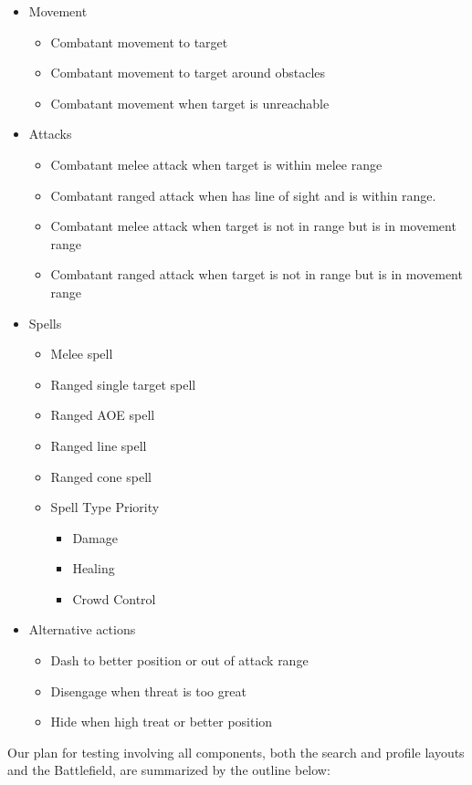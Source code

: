 \documentclass[12pt,a4paper]{report}
\begin{document}
	\begin{itemize}
		\item Movement
		\begin{itemize}
			\item Combatant movement to target
			\item Combatant movement to target around obstacles
			\item Combatant movement when target is unreachable
		\end{itemize}
		\item Attacks
		\begin{itemize}
			\item Combatant melee attack when target is within melee range
			\item Combatant ranged attack when has line of sight and is within range.
			\item Combatant melee attack when target is not in range but is in movement range
			\item Combatant ranged attack when target is not in range but is in movement range
		\end{itemize}
		\item Spells
		\begin{itemize}
			\item Melee spell
			\item Ranged single target spell
			\item Ranged AOE spell
			\item Ranged line spell
			\item Ranged cone spell
			\item Spell Type Priority
			\begin{itemize}
				\item Damage
				\item Healing
				\item Crowd Control
			\end{itemize}
		\end{itemize}
		\item Alternative actions
		\begin{itemize}
			\item Dash to better position or out of attack range
			\item Disengage when threat is too great
			\item Hide when high treat or better position
		\end{itemize}
	\end{itemize}
	
	Our plan for testing involving all components, both the search and profile layouts and the Battlefield, are summarized by the outline below:
	
\end{document}

